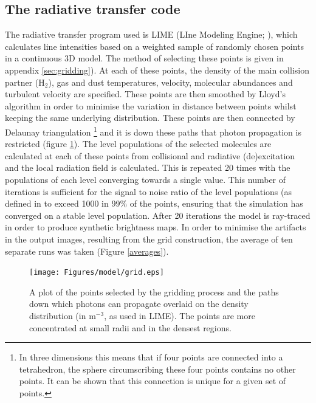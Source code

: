 \documentclass[useAMS,usenatbib]{mn2e}
\begin{document}
\subsection{The radiative transfer code} \label{subsec:radiative_transfer_code}
The radiative transfer program used is LIME (LIne Modeling Engine; \cite{Brinch2010}), which  calculates line intensities based on a weighted sample of randomly chosen points in a continuous 3D model. The method of selecting these points is given in appendix  \ref{sec:gridding}). At each of these points, the density of the main collision partner (H$_2$), gas and dust temperatures, velocity, molecular abundances and turbulent velocity are specified. These points are then smoothed by Lloyd's algorithm \citep{Lloyd1982} in order to minimise the variation in distance between points whilst keeping the same underlying distribution. These points are then connected by Delaunay triangulation \footnote{In three dimensions this means that if four points are connected into a tetrahedron, the sphere circumscribing these four points contains no other points. It can be shown that this connection is unique for a given set of points.} and it is down these paths that photon propagation is restricted (figure \ref{grid}). The level populations of the selected molecules are calculated at each of these points from collisional and radiative (de)excitation and the local radiation field is calculated. This is repeated 20 times with the populations of each level converging towards a single value. This number of iterations is sufficient for the signal to noise ratio of the level populations (as defined in \cite{Brinch2010} to exceed 1000 in 99\% of the points, ensuring that the simulation has converged on a stable level population. After 20 iterations the model is ray-traced in order to produce synthetic brightness maps. In order to minimise the artifacts in the output images, resulting from the grid construction, the average of ten separate runs was taken (Figure \ref{averages}).


\begin{figure}
 \texttt{[image: Figures/model/grid.eps]}%
 \caption{A plot of the points selected by the gridding process and the paths down which photons can propagate overlaid on the density distribution (in m$^{-3}$, as used in LIME). The points are more concentrated at small radii and in the densest regions.}
 \label{grid}
\end{figure}
\end{document}

